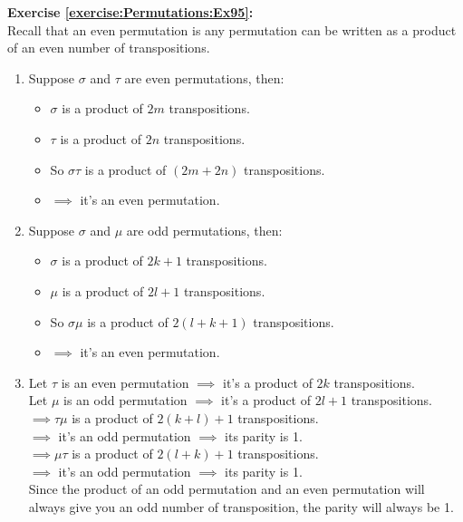 \noindent\textbf{Exercise  \ref{exercise:Permutations:Ex95}:}\\ %
Recall that an even permutation is any permutation can be written as a product of an even number of transpositions.
\begin{enumerate}[{a.}]
\item
Suppose $\sigma$ and $\tau$ are even permutations, then:
	\begin{itemize}
	\item
	$\sigma$ is a product of $2m$ transpositions.

	\item
	$\tau$ is a product of $2n$ transpositions.

	\item
	So $\sigma\tau$ is a product of $(2m+2n)$ transpositions.

	\item
	$\implies$  it's an even permutation.
	\end{itemize}

\item
Suppose $\sigma$ and $\mu$ are odd permutations, then:
	\begin{itemize}
	\item
	$\sigma$ is a product of $2k+1$ transpositions.

	\item
	$\mu$ is a product of $2l+1$ transpositions.

	\item
	So $\sigma\mu$ is a product of $2(l+k+1)$ transpositions.
	
	\item
	$\implies$  it's an even permutation.
	\end{itemize}

\item
Let $\tau$ is an even permutation $\implies$  it's a product of $2k$ transpositions.\\
Let $\mu$ is an odd permutation $\implies$  it's a product of $2l+1$ transpositions.\\
$\implies \tau\mu$ is a product of $2(k+l)+1$ transpositions.\\
$\implies$  it's an odd permutation $\implies$  its parity is 1.\\
$\implies \mu\tau$ is a product of $2(l+k)+1$ transpositions.\\
$\implies$  it's an odd permutation $\implies$  its parity is 1.\\
Since the product of an odd permutation and an even permutation will always give you an odd number of transposition, the parity will always be 1.
\end{enumerate}

